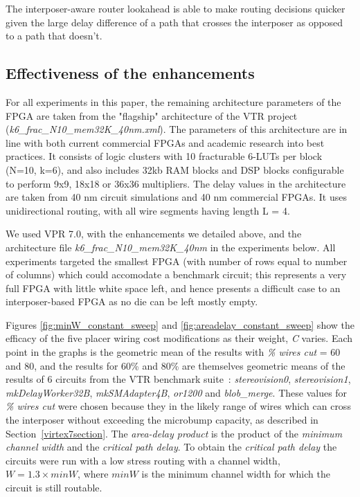 \documentclass{sig-alternate-2013}
\begin{document}
The interposer-aware router lookahead is able to make routing decisions quicker given the large delay difference of a path that crosses the interposer as opposed to a path that doesn't.

\subsection{Effectiveness of the enhancements}
\label{sec:CADeffect}
For all experiments in this paper, the remaining architecture parameters of the FPGA are taken from the "flagship" architecture of the VTR project (\textit{k6\_frac\_N10\_mem32K\_40nm.xml}). The parameters of this architecture are in line with both current commercial FPGAs and academic research into best practices. It consists of logic clusters with 10 fracturable 6-LUTs per block (N=10, k=6), and also includes 32kb RAM blocks and DSP blocks configurable to perform 9x9, 18x18 or 36x36 multipliers. The delay values in the architecture are taken from 40 nm circuit simulations and 40 nm commercial FPGAs. It uses unidirectional routing, with all wire segments having length L = 4.

We used VPR 7.0, with the enhancements we detailed above, and the architecture file \textit{k6\_frac\_N10\_mem32K\_40nm} in the experiments below. All experiments targeted the smallest FPGA (with number of rows equal to number of columns) which could accomodate a benchmark circuit; this represents a very full FPGA with little white space left, and hence presents a difficult case to an interposer-based FPGA as no die can be left mostly empty.

Figures \ref{fig:minW_constant_sweep} and \ref{fig:areadelay_constant_sweep} show the efficacy of the five placer wiring cost modifications as their weight, \textit{C} varies. Each point in the graphs is the geometric mean of the results with \textit{\% wires cut} = 60 and 80, and the results for 60\% and 80\% are themselves geometric means of the results of 6 circuits from the VTR benchmark suite~\cite{vtr2012}:  \textit{stereovision0}, \textit{stereovision1}, \textit{mkDelayWorker32B}, \textit{mkSMAdapter4B}, \textit{or1200} and \textit{blob\_merge}. These values for \textit{\% wires cut} were chosen because they in the likely range of wires which can cross the interposer without exceeding the microbump capacity, as described in Section~\ref{virtex7section}. The \textit{area-delay product} is the product of the \textit{minimum channel width} and the \textit{critical path delay}. To obtain the \textit{critical path delay} the circuits were run with a low stress routing with a channel width, $W = 1.3 \times minW$, where $minW$ is the minimum channel width for which the circuit is still routable. 
\end{document}
